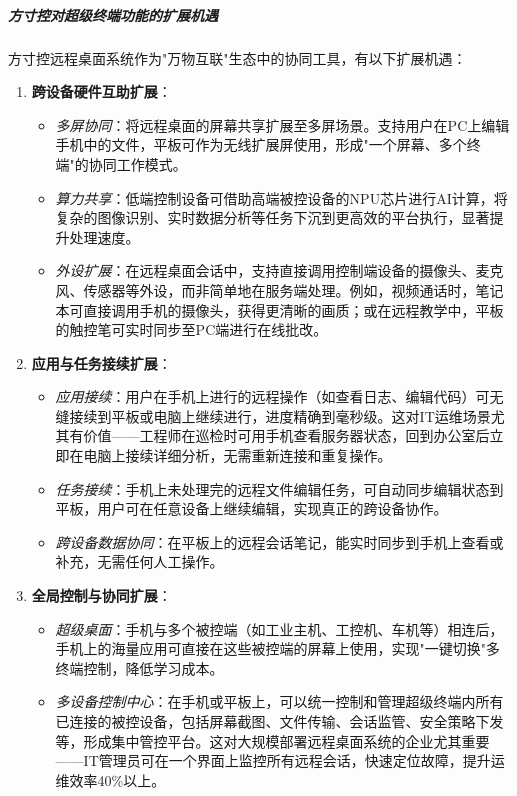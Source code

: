 \documentclass[12pt,a4paper]{article}
\begin{document}
\subparagraph{方寸控对超级终端功能的扩展机遇}

方寸控远程桌面系统作为"万物互联"生态中的协同工具，有以下扩展机遇：

\begin{enumerate}[noitemsep]
\item \textbf{跨设备硬件互助扩展}：
  \begin{itemize}[noitemsep]
    \item \textit{多屏协同}：将远程桌面的屏幕共享扩展至多屏场景。支持用户在PC上编辑手机中的文件，平板可作为无线扩展屏使用，形成"一个屏幕、多个终端"的协同工作模式。
    \item \textit{算力共享}：低端控制设备可借助高端被控设备的NPU芯片进行AI计算，将复杂的图像识别、实时数据分析等任务下沉到更高效的平台执行，显著提升处理速度。
    \item \textit{外设扩展}：在远程桌面会话中，支持直接调用控制端设备的摄像头、麦克风、传感器等外设，而非简单地在服务端处理。例如，视频通话时，笔记本可直接调用手机的摄像头，获得更清晰的画质；或在远程教学中，平板的触控笔可实时同步至PC端进行在线批改。
  \end{itemize}

\item \textbf{应用与任务接续扩展}：
  \begin{itemize}[noitemsep]
    \item \textit{应用接续}：用户在手机上进行的远程操作（如查看日志、编辑代码）可无缝接续到平板或电脑上继续进行，进度精确到毫秒级。这对IT运维场景尤其有价值——工程师在巡检时可用手机查看服务器状态，回到办公室后立即在电脑上接续详细分析，无需重新连接和重复操作。
    \item \textit{任务接续}：手机上未处理完的远程文件编辑任务，可自动同步编辑状态到平板，用户可在任意设备上继续编辑，实现真正的跨设备协作。
    \item \textit{跨设备数据协同}：在平板上的远程会话笔记，能实时同步到手机上查看或补充，无需任何人工操作。
  \end{itemize}

\item \textbf{全局控制与协同扩展}：
  \begin{itemize}[noitemsep]
    \item \textit{超级桌面}：手机与多个被控端（如工业主机、工控机、车机等）相连后，手机上的海量应用可直接在这些被控端的屏幕上使用，实现"一键切换"多终端控制，降低学习成本。
    \item \textit{多设备控制中心}：在手机或平板上，可以统一控制和管理超级终端内所有已连接的被控设备，包括屏幕截图、文件传输、会话监管、安全策略下发等，形成集中管控平台。这对大规模部署远程桌面系统的企业尤其重要——IT管理员可在一个界面上监控所有远程会话，快速定位故障，提升运维效率40\%以上。
  \end{itemize}
\end{enumerate}
\end{document}

